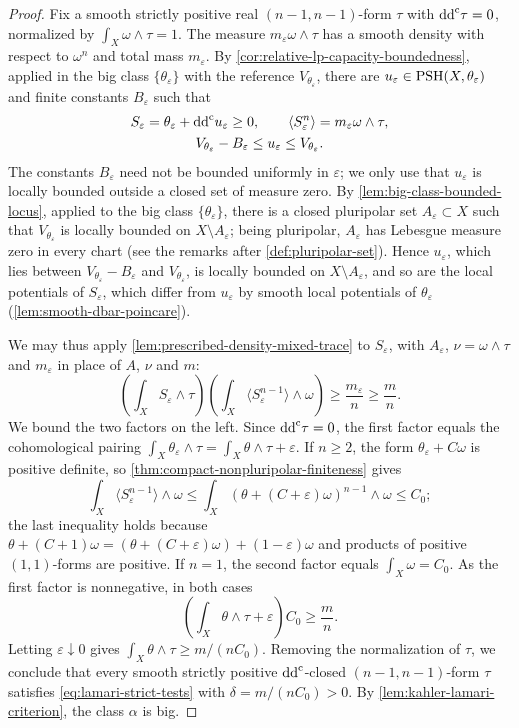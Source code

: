 \begin{proof}
Fix a smooth strictly positive real $(n-1,n-1)$-form $\tau$ with $\mathrm{dd}^{\mathrm{c}}\tau=0$, normalized by $\int_X\omega\wedge\tau=1$. The measure $m_\varepsilon\omega\wedge\tau$ has a smooth density with respect to $\omega^n$ and total mass $m_\varepsilon$. By \cref{cor:relative-lp-capacity-boundedness}, applied in the big class $\{\theta_\varepsilon\}$ with the reference $V_{\theta_\varepsilon}$, there are $u_\varepsilon\in\mathrm{PSH}(X,\theta_\varepsilon)$ and finite constants $B_\varepsilon$ such that
\[
 \begin{gathered}
 S_\varepsilon=\theta_\varepsilon+\mathrm{dd}^{\mathrm{c}} u_\varepsilon\geq0,
 \qquad \langle S_\varepsilon^n\rangle
                =m_\varepsilon\omega\wedge\tau,\\
 V_{\theta_\varepsilon}-B_\varepsilon
                   \leq u_\varepsilon\leq V_{\theta_\varepsilon}.
 \end{gathered}
\]
The constants $B_\varepsilon$ need not be bounded uniformly in $\varepsilon$; we only use that $u_\varepsilon$ is locally bounded outside a closed set of measure zero. By \cref{lem:big-class-bounded-locus}, applied to the big class $\{\theta_\varepsilon\}$, there is a closed pluripolar set $A_\varepsilon\subset X$ such that $V_{\theta_\varepsilon}$ is locally bounded on $X\setminus A_\varepsilon$; being pluripolar, $A_\varepsilon$ has Lebesgue measure zero in every chart (see the remarks after \cref{def:pluripolar-set}). Hence $u_\varepsilon$, which lies between $V_{\theta_\varepsilon}-B_\varepsilon$ and $V_{\theta_\varepsilon}$, is locally bounded on $X\setminus A_\varepsilon$, and so are the local potentials of $S_\varepsilon$, which differ from $u_\varepsilon$ by smooth local potentials of $\theta_\varepsilon$ (\cref{lem:smooth-dbar-poincare}).

We may thus apply \cref{lem:prescribed-density-mixed-trace} to $S_\varepsilon$, with $A_\varepsilon$, $\nu=\omega\wedge\tau$ and $m_\varepsilon$ in place of $A$, $\nu$ and $m$:
\[
 \left(\int_X S_\varepsilon\wedge\tau\right)
        \left(\int_X\langle S_\varepsilon^{n-1}\rangle\wedge\omega\right)
 \geq\frac{m_\varepsilon}{n}\geq\frac mn.
\]
We bound the two factors on the left. Since $\mathrm{dd}^{\mathrm{c}}\tau=0$, the first factor equals the cohomological pairing $\int_X\theta_\varepsilon\wedge\tau=\int_X\theta\wedge\tau+\varepsilon$. If $n\geq2$, the form $\theta_\varepsilon+C\omega$ is positive definite, so \cref{thm:compact-nonpluripolar-finiteness} gives
\[
 \int_X\langle S_\varepsilon^{n-1}\rangle\wedge\omega
 \leq\int_X(\theta+(C+\varepsilon)\omega)^{n-1}\wedge\omega
 \leq C_0;
\]
the last inequality holds because $\theta+(C+1)\omega=(\theta+(C+\varepsilon)\omega)+(1-\varepsilon)\omega$ and products of positive $(1,1)$-forms are positive. If $n=1$, the second factor equals $\int_X\omega=C_0$. As the first factor is nonnegative, in both cases
\[
 \left(\int_X\theta\wedge\tau+\varepsilon\right)C_0\geq\frac mn.
\]
Letting $\varepsilon\downarrow0$ gives $\int_X\theta\wedge\tau\geq m/(nC_0)$. Removing the normalization of $\tau$, we conclude that every smooth strictly positive $\mathrm{dd}^{\mathrm{c}}$-closed $(n-1,n-1)$-form $\tau$ satisfies \eqref{eq:lamari-strict-tests} with $\delta=m/(nC_0)>0$. By \cref{lem:kahler-lamari-criterion}, the class $\alpha$ is big.
\end{proof}
